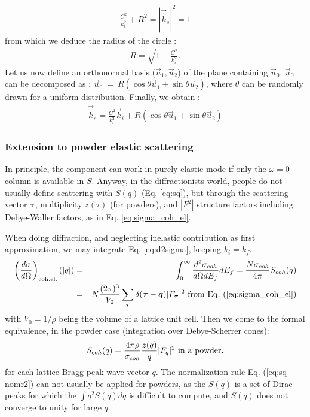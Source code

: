 \begin{align}
\frac{C^2}{k_i^2} + R^2 = |\vec{\hat k}_s|^2 = 1
\end{align}
from which we deduce the radius of the circle :
\begin{align}
R = \sqrt{1 - \frac{C^2}{k_i^2}}.
\end{align}
Let us now define an orthonormal basis ($\vec{u}_1,\vec{u}_2$) of the plane containing $\vec{u}_0$.
$\vec{u}_0$ can be decomposed as : $\vec{u}_0~=~R(\cos \theta \vec{u}_1 + \sin \theta \vec{u}_2)$, where $\theta$ can be randomly drawn for a uniform distribution.
Finally, we obtain :
\begin{align}
\vec{\hat k}_s = \frac{C^2}{k_i^2} \vec{k}_i + R (\cos \theta \vec{u}_1 + \sin \theta \vec{u}_2)
\end{align}

\subsubsection{Extension to powder elastic scattering}

In principle, the component can work in purely elastic mode if only the $\omega = 0$ column is available in $S$.
Anyway, in the diffractionists world, people do not usually define scattering with $S(q)$ (Eq. \ref{eq:sq}), but through the scattering vector $\boldsymbol{\tau}$, multiplicity $z(\tau)$ (for powders), and $|F^2|$ structure factors including Debye-Waller factors, as in Eq. \ref{eq:sigma_coh_el}.

When doing diffraction, and neglecting inelastic contribution as first approximation, we may integrate Eq. \ref{eq:d2sigma}, keeping $k_i = k_f$.
\begin{eqnarray}
\left(\frac{d\sigma}{d\Omega}\right)_{\rm coh.el.}(|q|) &=& \int_0^\infty \frac{d^2\sigma_{coh}}{d\Omega dE_f} dE_f = \frac{N \sigma_{coh}}{4\pi} S_{coh}(q) \\
& = & N\frac{(2\pi)^3}{V_0}\sum_{\boldsymbol{\tau}} \delta(\boldsymbol{\tau} - \boldsymbol{q})|F_{\boldsymbol{\tau}}|^2 {\rm\ from\ Eq.\ (\ref{eq:sigma_coh_el})}
\end{eqnarray}
with $V_0 = 1/\rho$ being the volume of a lattice unit cell. Then we come to the formal equivalence, in the powder case \cite{squires} (integration over Debye-Scherrer cones):
\begin{eqnarray}\label{eq:sq-F2}
S_{coh}(q) = \frac{4 \pi \rho}{\sigma_{coh}} \frac{z(q)}{q} |F_q|^2 {\rm\ in\ a\ powder.}
\end{eqnarray}
for each lattice Bragg peak wave vector $q$.
The normalization rule Eq. (\ref{eq:sq-nomr2}) can not usually be applied for powders, as the $S(q)$ is a set of Dirac peaks for which the $\int q^2 S(q) dq$ is difficult to compute, and $S(q)$ does not converge to unity for large $q$.

